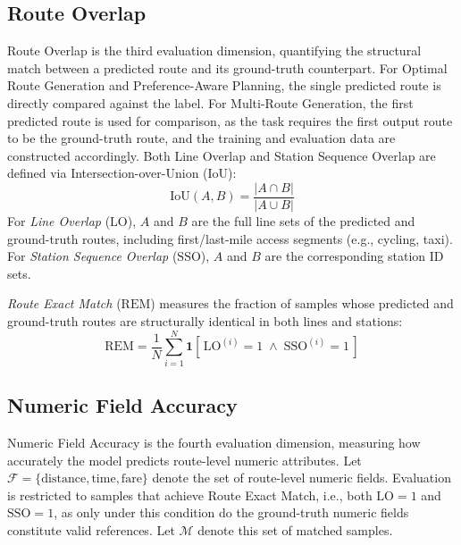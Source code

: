\documentclass{llmxive}
\begin{document}
\subsection{Route Overlap}
Route Overlap is the third evaluation dimension, quantifying the structural match between a predicted route and its ground-truth counterpart. For Optimal Route Generation and Preference-Aware Planning, the single predicted route is directly compared against the label. For Multi-Route Generation, the first predicted route is used for comparison, as the task requires the first output route to be the ground-truth route, and the training and evaluation data are constructed accordingly. Both Line Overlap and Station Sequence Overlap are defined via Intersection-over-Union (IoU):
\begin{equation}
\text{IoU}(A, B) = \frac{|A \cap B|}{|A \cup B|}
\end{equation}
For \textit{Line Overlap} ($\text{LO}$), $A$ and $B$ are the full line sets of the predicted and ground-truth routes, including first/last-mile access segments (e.g., cycling, taxi). For \textit{Station Sequence Overlap} ($\text{SSO}$), $A$ and $B$ are the corresponding station ID sets.

\textit{Route Exact Match} ($\text{REM}$) measures the fraction of samples whose predicted and ground-truth routes are structurally identical in both lines and stations:
\begin{equation}
\text{REM} = \frac{1}{N}\sum_{i=1}^{N} \mathbf{1}\!\left[\,\text{LO}^{(i)} = 1 \;\wedge\; \text{SSO}^{(i)} = 1\,\right]
\end{equation}

\subsection{Numeric Field Accuracy}

Numeric Field Accuracy is the fourth evaluation dimension, measuring how accurately the model predicts route-level numeric attributes. Let $\mathcal{F} = \{\text{distance}, \text{time}, \text{fare}\}$ denote the set of route-level numeric fields. Evaluation is restricted to samples that achieve Route Exact Match, i.e., both $\text{LO} = 1$ and $\text{SSO} = 1$, as only under this condition do the ground-truth numeric fields constitute valid references. Let $\mathcal{M}$ denote this set of matched samples.
\end{document}
